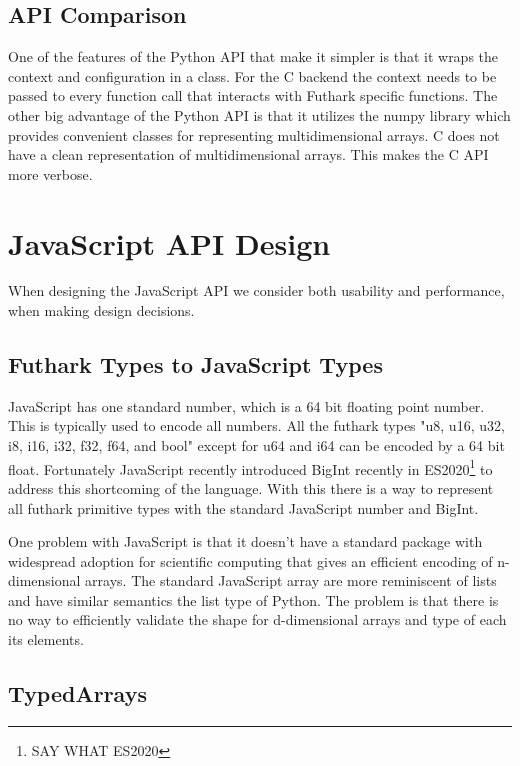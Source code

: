 \documentclass[11pt]{book}
\begin{document}
\subsection{API Comparison}

One of the features of the Python API that make it simpler is that it wraps the context and configuration in a class. For the C backend the context needs to be passed to every function call that interacts with Futhark specific functions. The other big advantage of the Python API is that it utilizes the numpy library which provides convenient classes for representing multidimensional arrays. C does not have a clean representation of multidimensional arrays. This makes the C API more verbose.



\section{JavaScript API Design}

When designing the JavaScript API we consider both usability and performance, when making design decisions. 


\subsection{Futhark Types to JavaScript Types}
JavaScript has one standard number, which is a 64 bit floating point number. This is typically used to encode all numbers. All the futhark types "u8, u16, u32, i8, i16, i32, f32, f64, and bool" except for u64 and i64 can be encoded by a 64 bit float. Fortunately JavaScript recently introduced BigInt recently in ES2020\footnote{SAY WHAT ES2020} to address this shortcoming of the language. With this there is a way to represent all futhark primitive types with the standard JavaScript number and BigInt. 

One problem with JavaScript is that it doesn't have a standard package with widespread adoption for scientific computing that gives an efficient encoding of n-dimensional arrays. The standard JavaScript array are more reminiscent of lists and have similar semantics the list type of Python. The problem is that there is no way to efficiently validate the shape for d-dimensional arrays and type of each its elements. 



\subsection{TypedArrays}
\end{document}
